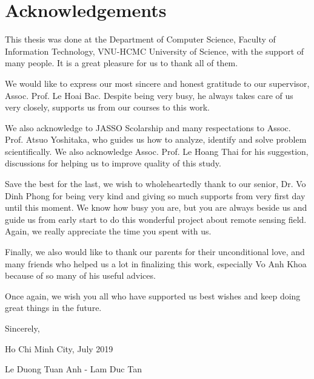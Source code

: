 \chapter{Acknowledgements}

This thesis was done at the Department of Computer Science, Faculty of Information Technology, VNU-HCMC University of Science, with the support of many people. It is a great pleasure for us to thank all of them.

We would like to express our most sincere and honest gratitude to our supervisor, Assoc. Prof. Le Hoai Bac. Despite being very busy, he always takes care of us very closely, supports us from our courses to this work.

We also acknowledge to JASSO Scolarship and many respectations to Assoc. Prof. Atsuo Yoshitaka, who guides us how to analyze, identify and solve problem scientifically. We also acknowledge Assoc. Prof. Le Hoang Thai for his suggestion, discussions for helping us to improve quality of this study.

Save the best for the last, we wish to wholeheartedly thank to our senior, Dr. Vo Dinh Phong for being very kind and giving so much supports from very first day until this moment. We know how busy you are, but you are always beside us and guide us from early start to do this wonderful project about remote sensing field. Again, we really appreciate the time you spent with us.

Finally, we also would like to thank our parents for their unconditional love, and many friends who helped us a lot in finalizing this work, especially Vo Anh Khoa because of so many of his useful advices.

Once again, we wish you all who have supported us best wishes and keep doing great things in the future.

Sincerely,
\begin{flushright}
\begin{minipage}{8cm}
\centering

Ho Chi Minh City, July 2019

Le Duong Tuan Anh - Lam Duc Tan

\end{minipage}
\end{flushright}